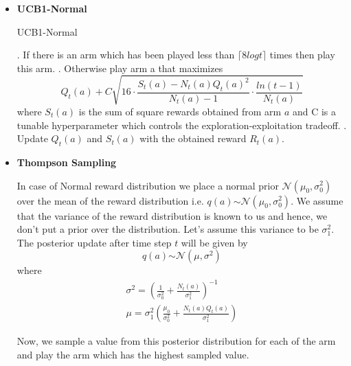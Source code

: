 \documentclass{article}
\begin{document}
	\noindent %
	\begin{itemize}
		
	
	\item \textbf{UCB1-Normal}
	\begin{algorithm}
		\caption{UCB1-Normal}\label{ucb1_normal}
		\begin{algorithmic}
				. If there is an arm which has been played less than $\lceil 8 log t \rceil$ times then play this arm.
				. Otherwise play arm a that maximizes
					\begin{equation}
					\nonumber
						Q_{t}(a) + C\sqrt{16 \cdot \frac{S_{t}(a) - N_{t}(a)Q_{t}(a)^2}{N_{t}(a) - 1} \cdot \frac{ln(t-1)}{N_{t}(a)}}
					\end{equation}
					where $S_{t}(a)$ is the sum of square rewards obtained from arm $a$ and C is a tunable hyperparameter which controls the exploration-exploitation
					tradeoff. 
				. Update $Q_{t}(a)$ and $S_{t}(a)$ with the obtained reward $R_{t}(a)$.
			\EndFor
		\end{algorithmic}
	\end{algorithm}
	
	\break \break
	
	\noindent %
	
	\item \textbf{Thompson Sampling}\par
	
	\noindent %
	In case of Normal reward distribution we place a normal prior $\mathcal{N} (\mu_{0}, \sigma_{0}^{2})$ over the mean of the reward distribution i.e. $q(a) \stackrel{}{\sim} 
	\mathcal{N} (\mu_{0}, \sigma_{0}^{2})$. We assume that the variance of the reward distribution is known to us and hence, we don't put a prior over the 
	distribution. Let's assume this variance to be $\sigma_{1}^{2}$.  The posterior 
	update after time step $t$ will be given by
	\begin{equation}
	\nonumber
		q(a) \stackrel{}{\sim} \mathcal{N} (\mu, \sigma^2)
	\end{equation}
	where
	\begin{equation}
	\nonumber
	\begin{gathered}
		\sigma^2 = \left (\frac{1}{\sigma_{0}^{2}} + \frac{N_{t}(a)}{\sigma_{1}^{2}} \right ) ^{-1}  \\
		\mu = \sigma_{1}^{2} \left ( \frac{\mu_{0}}{\sigma_{0}^{2}} + \frac{N_{t}(a)Q_{t}(a)}{\sigma_{1}^{2}} \right )
	\end{gathered}
	\end{equation}
	
	Now, we sample a value from this posterior distribution for each of the arm and play the arm which has the highest sampled value. 
	
	\end{itemize}
\end{document}
